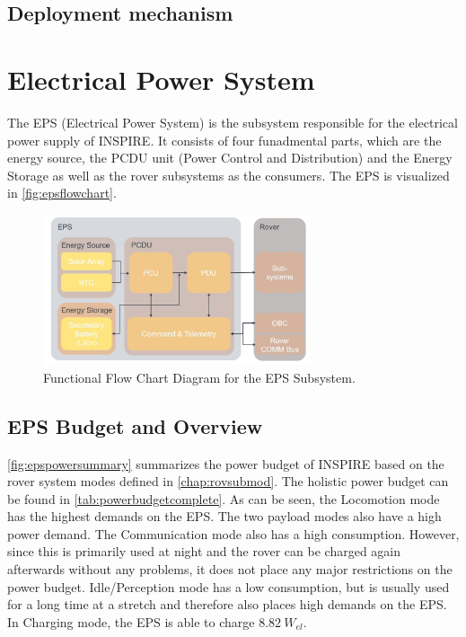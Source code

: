 \subsection{Deployment mechanism}

\section{Electrical Power System}
\label{sec:EPS}
The EPS (Electrical Power System) is the subsystem responsible for the electrical power supply of INSPIRE. It consists of four funadmental parts, which are the energy source, the PCDU unit (Power Control and Distribution) and the Energy Storage as well as the rover subsystems as the consumers. The EPS is visualized in \autoref{fig:epsflowchart}.

\begin{figure}[htb]
{\centering
\includegraphics[width=0.7\textwidth]{Media/epsflowchart}
\caption{Functional Flow Chart Diagram for the EPS Subsystem.}
\label{fig:epsflowchart}
}
\end{figure}


\subsection{EPS Budget and Overview}
\autoref{fig:epspowersummary} summarizes the power budget of INSPIRE based on the rover system modes defined in \autoref{chap:rovsubmod}. The holistic power budget can be found in \autoref{tab:powerbudgetcomplete}.
As can be seen, the Locomotion mode has the highest demands on the EPS. The two payload modes also have a high power demand. The Communication mode also has a high consumption. However, since this is primarily used at night and the rover can be charged again afterwards without any problems, it does not place any major restrictions on the power budget. Idle/Perception mode has a low consumption, but is usually used for a long time at a stretch and therefore also places high demands on the EPS. In Charging mode, the EPS is able to charge $8.82 \ W_{el} $.


